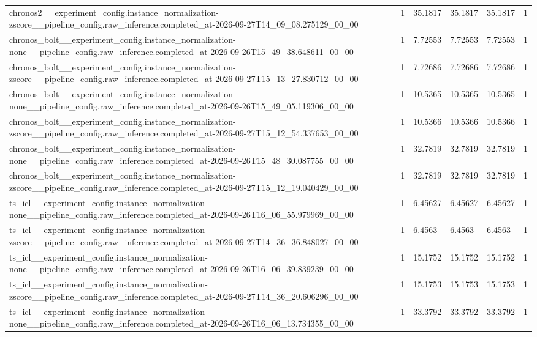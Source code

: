 \begin{tabular}{llllll}
chronos2\_\_experiment\_config.instance\_normalization-zscore\_\_pipeline\_config.raw\_inference.completed\_at-2026-09-27T14\_09\_08.275129\_00\_00 & 1 & 35.1817 & 35.1817 & 35.1817 & 1 \\
chronos\_bolt\_\_experiment\_config.instance\_normalization-none\_\_pipeline\_config.raw\_inference.completed\_at-2026-09-26T15\_49\_38.648611\_00\_00 & 1 & 7.72553 & 7.72553 & 7.72553 & 1 \\
chronos\_bolt\_\_experiment\_config.instance\_normalization-zscore\_\_pipeline\_config.raw\_inference.completed\_at-2026-09-27T15\_13\_27.830712\_00\_00 & 1 & 7.72686 & 7.72686 & 7.72686 & 1 \\
chronos\_bolt\_\_experiment\_config.instance\_normalization-none\_\_pipeline\_config.raw\_inference.completed\_at-2026-09-26T15\_49\_05.119306\_00\_00 & 1 & 10.5365 & 10.5365 & 10.5365 & 1 \\
chronos\_bolt\_\_experiment\_config.instance\_normalization-zscore\_\_pipeline\_config.raw\_inference.completed\_at-2026-09-27T15\_12\_54.337653\_00\_00 & 1 & 10.5366 & 10.5366 & 10.5366 & 1 \\
chronos\_bolt\_\_experiment\_config.instance\_normalization-none\_\_pipeline\_config.raw\_inference.completed\_at-2026-09-26T15\_48\_30.087755\_00\_00 & 1 & 32.7819 & 32.7819 & 32.7819 & 1 \\
chronos\_bolt\_\_experiment\_config.instance\_normalization-zscore\_\_pipeline\_config.raw\_inference.completed\_at-2026-09-27T15\_12\_19.040429\_00\_00 & 1 & 32.7819 & 32.7819 & 32.7819 & 1 \\
ts\_icl\_\_experiment\_config.instance\_normalization-none\_\_pipeline\_config.raw\_inference.completed\_at-2026-09-26T16\_06\_55.979969\_00\_00 & 1 & 6.45627 & 6.45627 & 6.45627 & 1 \\
ts\_icl\_\_experiment\_config.instance\_normalization-zscore\_\_pipeline\_config.raw\_inference.completed\_at-2026-09-27T14\_36\_36.848027\_00\_00 & 1 & 6.4563 & 6.4563 & 6.4563 & 1 \\
ts\_icl\_\_experiment\_config.instance\_normalization-none\_\_pipeline\_config.raw\_inference.completed\_at-2026-09-26T16\_06\_39.839239\_00\_00 & 1 & 15.1752 & 15.1752 & 15.1752 & 1 \\
ts\_icl\_\_experiment\_config.instance\_normalization-zscore\_\_pipeline\_config.raw\_inference.completed\_at-2026-09-27T14\_36\_20.606296\_00\_00 & 1 & 15.1753 & 15.1753 & 15.1753 & 1 \\
ts\_icl\_\_experiment\_config.instance\_normalization-none\_\_pipeline\_config.raw\_inference.completed\_at-2026-09-26T16\_06\_13.734355\_00\_00 & 1 & 33.3792 & 33.3792 & 33.3792 & 1 \\

\end{tabular}
